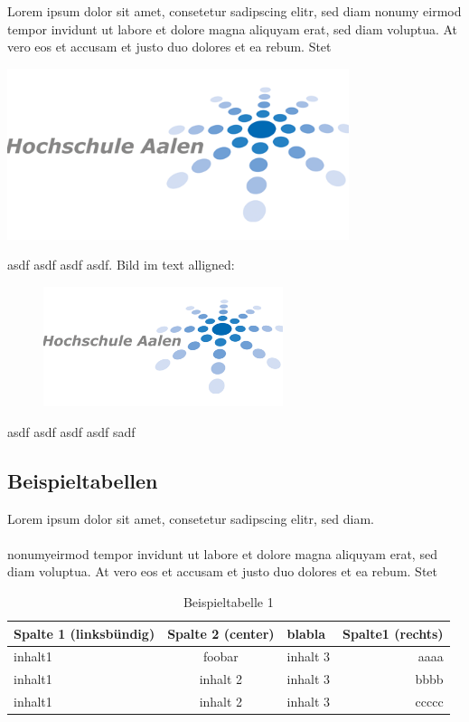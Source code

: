 Lorem ipsum dolor sit amet, consetetur sadipscing elitr, sed diam nonumy eirmod tempor invidunt ut labore et dolore magna aliquyam erat, sed diam voluptua. At vero eos et accusam et justo duo dolores et ea rebum. Stet
\begin{center}
	\includegraphics[width=10cm]{images/institute_logo.png}
\end{center}


asdf asdf asdf asdf. Bild im text alligned:

\begin{figure}\centering
    \includegraphics[width=7cm]{./images/institute_logo.png}
\end{figure}

asdf asdf asdf asdf sadf

\clearpage

\subsection{Beispieltabellen}
Lorem ipsum dolor sit amet, consetetur sadipscing elitr, sed diam.\\\\
 nonumyeirmod tempor invidunt ut labore et dolore magna aliquyam erat, sed diam voluptua. At vero eos et accusam et justo duo dolores et ea rebum. Stet


\begin{table}[h]
\begin{tabularx}{\textwidth}{|l|c|X|r|}
	\hline
	\textbf{Spalte 1} (linksbündig) & \textbf{Spalte 2} (center) &
	blabla & \textbf{Spalte1} (rechts) \\
	\hline
	\hline
	inhalt1 & foobar & inhalt 3 & aaaa \\
	\hline
	inhalt1 & inhalt 2 & inhalt 3 & bbbb \\
	\hline
	inhalt1 & inhalt 2 & inhalt 3 & ccccc \\
	\hline
\end{tabularx}
\caption{Beispieltabelle 1}
\end{table}


